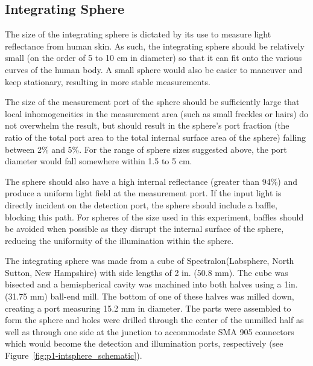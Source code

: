 \subsection{Integrating Sphere}
The size of the integrating sphere is dictated by its use to measure light reflectance from human skin. As such, the integrating sphere should be relatively small (on the order of 5 to 10 cm in diameter) so that it can fit onto the various curves of the human body. A small sphere would also be easier to maneuver and keep stationary, resulting in more stable measurements.

The size of the measurement port of the sphere should be sufficiently large that local inhomogeneities in the measurement area (such as small freckles or hairs) do not overwhelm the result, but should result in the sphere’s port fraction (the ratio of the total port area to the total internal surface area of the sphere) falling between 2\% and 5\%.\cite{Hanssen2002} For the range of sphere sizes suggested above, the port diameter would fall somewhere within 1.5 to 5 cm.

The sphere should also have a high internal reflectance (greater than 94\%) and produce a uniform light field at the measurement port.\cite{Labsphereb,Labspherea,Labsphere} If the input light is directly incident on the detection port, the sphere should include a baffle, blocking this path. For spheres of the size used in this experiment, baffles should be avoided when possible as they disrupt the internal surface of the sphere, reducing the uniformity of the illumination within the sphere.

The integrating sphere was made from a cube of Spectralon\textregistered (Labsphere\textregistered, North Sutton, New Hampshire) with side lengths of 2 in. (50.8 mm). The cube was bisected and a hemispherical cavity was machined into both halves using a 1\textonequarter in. (31.75 mm) ball-end mill. The bottom of one of these halves was milled down, creating a port measuring 15.2 mm in diameter. The parts were assembled to form the sphere and holes were drilled through the center of the unmilled half as well as through one side at the junction to accommodate SMA 905 connectors which would become the detection and illumination ports, respectively (see Figure~\ref{fig:p1-intsphere_schematic}).

